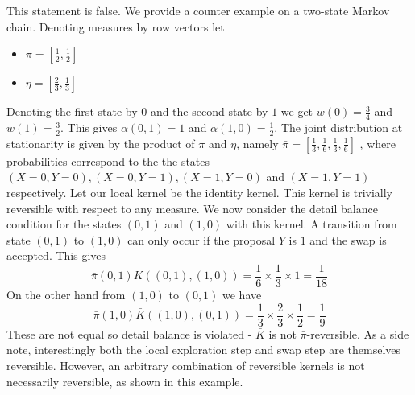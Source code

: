 \documentclass{article}
\begin{document}
\begin{enumerate}
    This statement is false. We provide a counter example on a two-state Markov
    chain. Denoting measures by row vectors let
    \begin{itemize}
        \item $\pi = \left[\frac 1 2, \frac 1 2 \right]$
        \item $\eta = \left[ \frac 2 3, \frac 1 3 \right]$
    \end{itemize}
    Denoting the first state by $0$ and the second state by $1$ we get
    $w(0) = \frac 3 4$ and $w(1) = \frac 3 2$. This gives
    $\alpha(0, 1) = 1$ and $\alpha(1, 0) = \frac 1 2$. The joint distribution
    at stationarity is given by the product of $\pi$ and $\eta$, namely
    $\bar \pi = \left[\frac 1 3, \frac 1 6, \frac 1 3, \frac 1 6\right]$
    , where probabilities correspond to the the states
    $(X=0, Y=0), (X=0, Y=1), (X=1, Y=0)$ and $(X=1,Y=1)$ respectively.
    Let our local kernel be the identity kernel. This kernel is trivially
    reversible with respect to any measure.
    We now consider the detail balance condition for the states $(0, 1)$ and
    $(1,0)$ with this kernel. A transition from state $(0,1)$ to $(1, 0)$ can
    only occur if the proposal $Y$ is $1$ and the swap is accepted. This 
    gives
    \[
        \bar \pi (0, 1)\bar K((0, 1), (1,  0)) = 
            \frac 1 6 \times \frac 1 3 \times  1 = \frac 1 {18}
    \]
    On the other hand from $(1,0)$ to $(0, 1)$ we have
    \[
        \bar \pi(1, 0)\bar K((1, 0), (0, 1)) = 
            \frac 1 3 \times \frac 2 3 \times \frac 1 2 = \frac 1 9
    \]
    These are not equal so detail balance is violated - $\bar K$ is not
    $\bar \pi$-reversible. As a side note, interestingly both the local
    exploration step and swap step are themselves reversible. However, an
    arbitrary combination of reversible kernels is not necessarily reversible,
    as shown in this example.
\end{enumerate}

\FloatBarrier
\newpage
\end{document}
